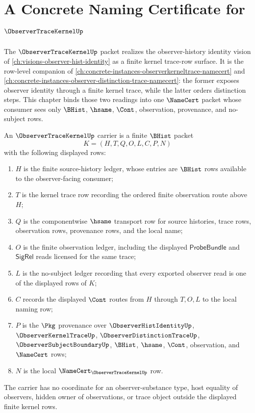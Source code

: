 \chapter{A Concrete Naming Certificate for $\ObserverTraceKernelUp$}
\label{ch:concrete-instances-observertracekernel-namecert}

The $\ObserverTraceKernelUp$ packet realizes the observer-history identity vision of \autoref{ch:visions-observer-hist-identity} as a finite kernel trace-row surface. It is the row-level companion of \autoref{ch:concrete-instances-observerkerneltrace-namecert} and \autoref{ch:concrete-instances-observer-distinction-trace-namecert}: the former exposes observer identity through a finite kernel trace, while the latter orders distinction steps. This chapter binds those two readings into one $\NameCert$ packet whose consumer sees only $\BHist$, $\hsame$, $\Cont$, observation, provenance, and no-subject rows.

\begin{definition}
\label{def:observer-trace-kernel-carrier}
An $\ObserverTraceKernelUp$ carrier is a finite $\BHist$ packet
$$
K=(H,T,Q,O,L,C,P,N)
$$
with the following displayed rows:
\begin{enumerate}
\item $H$ is the finite source-history ledger, whose entries are $\BHist$ rows available to the observer-facing consumer;
\item $T$ is the kernel trace row recording the ordered finite observation route above $H$;
\item $Q$ is the componentwise $\hsame$ transport row for source histories, trace rows, observation rows, provenance rows, and the local name;
\item $O$ is the finite observation ledger, including the displayed $\mathsf{ProbeBundle}$ and $\mathsf{SigRel}$ reads licensed for the same trace;
\item $L$ is the no-subject ledger recording that every exported observer read is one of the displayed rows of $K$;
\item $C$ records the displayed $\Cont$ routes from $H$ through $T,O,L$ to the local naming row;
\item $P$ is the $\Pkg$ provenance over $\ObserverHistIdentityUp$, $\ObserverKernelTraceUp$, $\ObserverDistinctionTraceUp$, $\ObserverSubjectBoundaryUp$, $\BHist$, $\hsame$, $\Cont$, observation, and $\NameCert$ rows;
\item $N$ is the local $\NameCert_{\ObserverTraceKernelUp}$ row.
\end{enumerate}
The carrier has no coordinate for an observer-substance type, host equality of observers, hidden owner of observations, or trace object outside the displayed finite kernel rows.
\end{definition}

